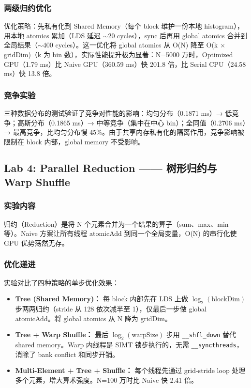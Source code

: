 \documentclass[a4paper]{article}
\begin{document}
\subsubsection{两级归约优化}

优化策略：先私有化到 Shared Memory（每个 block 维护一份本地 histogram），用本地 atomics 累加（LDS 延迟 $\sim$20 cycles），sync 后再用 global atomics 合并到全局结果（$\sim$400 cycles）。这一优化将 global atomics 从 O(N) 降至 O(k $\times$ gridDim)（k 为 bin 数），实际性能提升极为显著：N=5000 万时，Optimized GPU（1.79 ms）比 Naive GPU（360.59 ms）快 201.8 倍，比 Serial CPU（24.58 ms）快 13.8 倍。

\subsubsection{竞争实验}

三种数据分布的测试验证了竞争对性能的影响：均匀分布（0.1871 ms）→ 低竞争；高斯分布（0.1865 ms）→ 中等竞争（集中在中心 bin）；全同值（0.2706 ms）→ 最高竞争，比均匀分布慢 45\%。由于共享内存私有化的隔离作用，竞争影响被限制在 block 内部，global memory 不受影响。

\subsection{Lab 4: Parallel Reduction —— 树形归约与 Warp Shuffle}

\subsubsection{实验内容}

归约（Reduction）是将 N 个元素合并为一个结果的算子（sum、max、min 等）。Naive 方案让所有线程 atomicAdd 到同一个全局变量，O(N) 的串行化使 GPU 优势荡然无存。

\subsubsection{优化递进}

实验对比了四种策略的单步优化效果：

\begin{itemize}
    \item \textbf{Tree (Shared Memory)：} 每 block 内部先在 LDS 上做 $\log_2(\text{blockDim})$ 步两两归约（stride 从 128 依次减半至 1），仅最后一步做 global atomicAdd。将 global atomics 从 N 降为 gridDim。
    \item \textbf{Tree + Warp Shuffle：} 最后 $\log_2(\text{warpSize})$ 步用 \texttt{\_\_shfl\_down} 替代 shared memory。Warp 内线程是 SIMT 锁步执行的，无需 \texttt{\_\_syncthreads}，消除了 bank conflict 和同步开销。
    \item \textbf{Multi-Element + Tree + Shuffle：} 每个线程先通过 grid-stride loop 处理多个元素，增大算术强度。N=100 万时比 Naive 快 2.41 倍。
\end{itemize}
\end{document}
